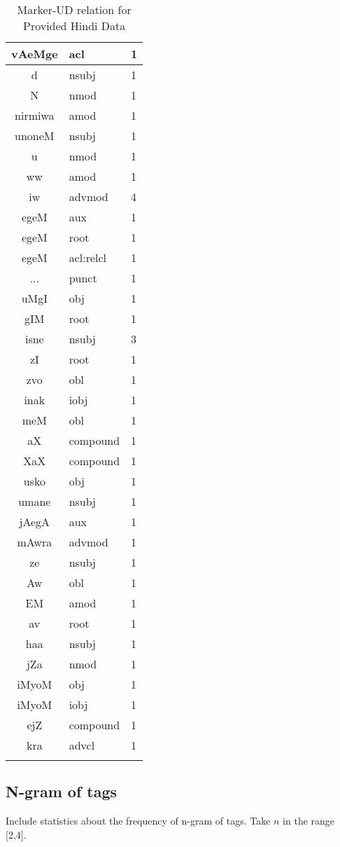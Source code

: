 \documentclass[a4 paper]{article}
\begin{document}
\begin{longtable}{cp{}p{}}
vAeMge & acl & 1\\ \midrule 
d & nsubj & 1\\ \midrule 
N & nmod & 1\\ \midrule 
nirmiwa & amod & 1\\ \midrule 
unoneM & nsubj & 1\\ \midrule 
u & nmod & 1\\ \midrule 
ww & amod & 1\\ \midrule 
iw & advmod & 4\\ \midrule 
egeM & aux & 1\\ \midrule egeM & root & 1\\ \midrule egeM & acl:relcl & 1\\ \midrule 
... & punct & 1\\ \midrule 
uMgI & obj & 1\\ \midrule 
gIM & root & 1\\ \midrule 
isne & nsubj & 3\\ \midrule 
zI & root & 1\\ \midrule 
zvo & obl & 1\\ \midrule 
inak & iobj & 1\\ \midrule 
meM & obl & 1\\ \midrule 
aX & compound & 1\\ \midrule 
XaX & compound & 1\\ \midrule 
usko & obj & 1\\ \midrule 
umane & nsubj & 1\\ \midrule 
jAegA & aux & 1\\ \midrule 
mAwra & advmod & 1\\ \midrule 
ze & nsubj & 1\\ \midrule 
Aw & obl & 1\\ \midrule 
EM & amod & 1\\ \midrule 
av & root & 1\\ \midrule 
haa & nsubj & 1\\ \midrule 
jZa & nmod & 1\\ \midrule 
iMyoM & obj & 1\\ \midrule iMyoM & iobj & 1\\ \midrule 
ejZ & compound & 1\\ \midrule 
kra & advcl & 1\\ \midrule 
\caption{Marker-UD relation for Provided Hindi Data}
\label{tab:markerudtable}
\end{longtable}


\subsection{N-gram of tags}
Include statistics about the frequency of n-gram of tags. Take $n$ in the range [2,4].
\end{document}
